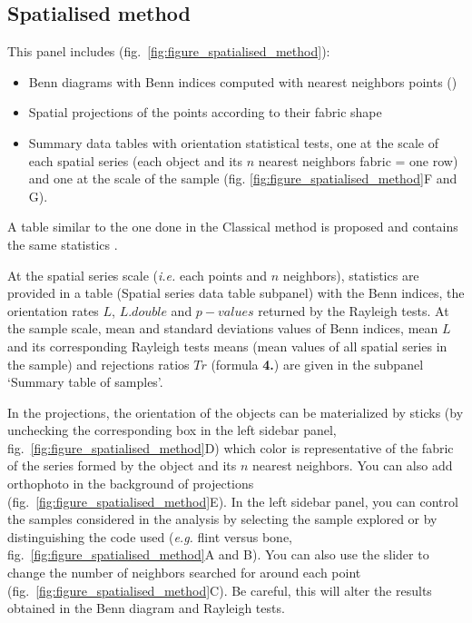 \documentclass[
]{article}
\providecommand{\tightlist}{%
  \setlength{\itemsep}{0pt}\setlength{\parskip}{0pt}}
\begin{document}
\subsection{Spatialised method}\label{spatialised-method-1}

This panel includes (fig.~\ref{fig:figure_spatialised_method}):

\begin{itemize}
\tightlist
\item
  Benn diagrams with Benn indices computed with nearest neighbors points
  ()
\item
  Spatial projections of the points according to their fabric shape
\item
  Summary data tables with orientation statistical tests, one at the
  scale of each spatial series (each object and its \(n\) nearest
  neighbors fabric = one row) and one at the scale of the sample (fig.
  \ref{fig:figure_spatialised_method}F and G).
\end{itemize}

A table similar to the one done in the Classical method is proposed and
contains the same statistics .

At the spatial series scale (\emph{i.e.} each points and \(n\)
neighbors), statistics are provided in a table (Spatial series data
table subpanel) with the Benn indices, the orientation rates \(L\),
\(L.double\) and \(p-values\) returned by the Rayleigh tests. At the
sample scale, mean and standard deviations values of Benn indices, mean
\(L\) and its corresponding Rayleigh tests means (mean values of all
spatial series in the sample) and rejections ratios \(Tr\) (formula
\textbf{4.}) are given in the subpanel `Summary table of samples'.

In the projections, the orientation of the objects can be materialized
by sticks (by unchecking the corresponding box in the left sidebar
panel, fig.~\ref{fig:figure_spatialised_method}D) which color is
representative of the fabric of the series formed by the object and its
\(n\) nearest neighbors. You can also add orthophoto in the background
of projections (fig.~\ref{fig:figure_spatialised_method}E). In the left
sidebar panel, you can control the samples considered in the analysis by
selecting the sample explored or by distinguishing the code used
(\emph{e.g.} flint versus bone,
fig.~\ref{fig:figure_spatialised_method}A and B). You can also use the
slider to change the number of neighbors searched for around each point
(fig.~\ref{fig:figure_spatialised_method}C). Be careful, this will alter
the results obtained in the Benn diagram and Rayleigh tests. \bigbreak
\end{document}
